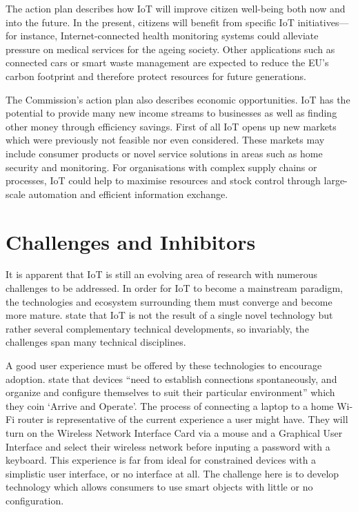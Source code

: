     The action plan \citep{ECIoT:2009} describes how IoT will improve citizen well-being both now and into the future. In the present, citizens will benefit from specific IoT initiatives---for instance, Internet-connected health monitoring systems could alleviate pressure on medical services for the ageing society. Other applications such as connected cars or smart waste management are expected to reduce the EU's carbon footprint and therefore protect resources for future generations.

    The Commission's action plan also describes economic opportunities. IoT has the potential to provide many new income streams to businesses as well as finding other money through efficiency savings. First of all IoT opens up new markets which were previously not feasible nor even considered. These markets may include consumer products or novel service solutions in areas such as home security and monitoring. For organisations with complex supply chains or processes, IoT could help to maximise resources and stock control through large-scale automation and efficient information exchange.

  \section{Challenges and Inhibitors}
  \label{challenges}
    It is apparent that IoT is still an evolving area of research with numerous challenges to be addressed. In order for IoT to become a mainstream paradigm, the technologies and ecosystem surrounding them must converge and become more mature. \citet{fromIoC} state that IoT is not the result of a single novel technology but rather several complementary technical developments, so invariably, the challenges span many technical disciplines. 

    A good user experience must be offered by these technologies to encourage adoption. \citet{fromIoC} state that devices ``need to establish connections spontaneously, and organize and configure themselves to suit their particular environment'' which they coin `Arrive and Operate'. The process of connecting a laptop to a home Wi-Fi router is representative of the current experience a user might have. They will turn on the Wireless Network Interface Card via a mouse and a Graphical User Interface and select their wireless network before inputing a password with a keyboard. This experience is far from ideal for constrained devices with a simplistic user interface, or no interface at all. The challenge here is to develop technology which allows consumers to use smart objects with little or no configuration.

